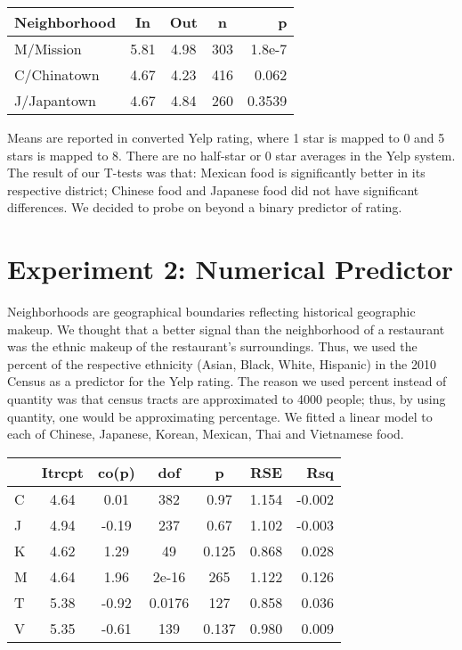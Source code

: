 \documentclass[11pt,twocolumn]{article}
\begin{document}
\begin{center}
  \begin{tabular}{| l | c | c | c | r | }
    \hline
    Neighborhood & In & Out & n & p \\ \hline
    M/Mission & 5.81 & 4.98 & 303 & 1.8e-7 \\ \hline \hline
    C/Chinatown & 4.67 & 4.23 & 416 & 0.062 \\ \hline
    J/Japantown & 4.67 & 4.84 & 260 & 0.3539 \\
    \hline
  \end{tabular}
\end{center}

Means are reported in converted Yelp rating, where 1 star is mapped to 0 and 5 stars is mapped to 8. There are no half-star or 0 star averages in the Yelp system. The result of our T-tests was that: Mexican food is significantly better in its respective district; Chinese food and Japanese food did not have significant differences. We decided to probe on beyond a binary predictor of rating.

\section{Experiment 2: Numerical Predictor}

Neighborhoods are geographical boundaries reflecting historical geographic makeup. We thought that a better signal than the neighborhood of a restaurant was the ethnic makeup of the restaurant's surroundings. Thus, we used the percent of the respective ethnicity (Asian, Black, White, Hispanic) in the 2010 Census as a predictor for the Yelp rating. The reason we used percent instead of quantity was that census tracts are approximated to 4000 people; thus, by using quantity, one would be approximating percentage. We fitted a linear model to each of Chinese, Japanese, Korean, Mexican, Thai and Vietnamese food.

\begin{center}
  \begin{tabular}{| l | c | c | c | c | c | r | }
    \hline
     & Itrcpt & co(p) & dof & p & RSE & Rsq \\ \hline \hline
    C & 4.64 & 0.01 & 382 & 0.97 & 1.154 & -0.002 \\ \hline
    J & 4.94 & -0.19 & 237 & 0.67 & 1.102 & -0.003 \\ \hline
    K & 4.62 & 1.29 & 49 & 0.125 & 0.868 & 0.028 \\ \hline
    M & 4.64 & 1.96 & 2e-16 & 265 & 1.122 & 0.126 \\ \hline
    T & 5.38 & -0.92 & 0.0176 & 127 & 0.858 & 0.036 \\ \hline
    V & 5.35 & -0.61 & 139 & 0.137 & 0.980 & 0.009 \\
    \hline
  \end{tabular}
\end{center}
\end{document}
